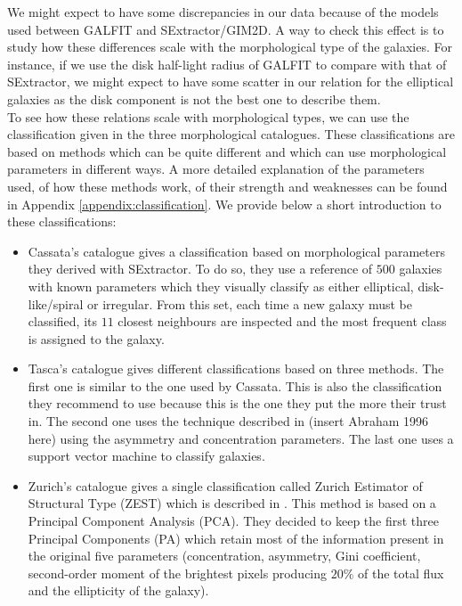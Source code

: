 We might expect to have some discrepancies in our data because of the models used between GALFIT and SExtractor/GIM2D. A way to check this effect is to study how these differences scale with the morphological type of the galaxies. For instance, if we use the disk half-light radius of GALFIT to compare with that of SExtractor, we might expect to have some scatter in our relation for the elliptical galaxies as the disk component is not the best one to describe them.\\

To see how these relations scale with morphological types, we can use the classification given in the three morphological catalogues. These classifications are based on methods which can be quite different and which can use morphological parameters in different ways. A more detailed explanation of the parameters used, of how these methods work, of their strength and weaknesses can be found in Appendix \ref{appendix:classification}. We provide below a short introduction to these classifications:

\begin{itemize}
	\item Cassata's catalogue gives a classification based on morphological parameters they derived with SExtractor. To do so, they use a reference of $500$ galaxies with known parameters which they visually classify as either elliptical, disk-like/spiral or irregular. From this set, each time a new galaxy must be classified, its $11$ closest neighbours are inspected and the most frequent class is assigned to the galaxy.
	
	\item Tasca's catalogue gives different classifications based on three methods. The first one is similar to the one used by Cassata. This is also the classification they recommend to use because this is the one they put the more their trust in. The second one uses the technique described in (insert Abraham 1996 here) using the asymmetry and concentration parameters. The last one uses a support vector machine to classify galaxies.
	
	\item Zurich's catalogue gives a single classification called Zurich Estimator of Structural Type (ZEST) which is described in . This method is based on a Principal Component Analysis (PCA). They decided to keep the first three Principal Components (PA) which retain most of the information present in the original five parameters (concentration, asymmetry, Gini coefficient, second-order moment of the brightest pixels producing $20\%$ of the total flux and the ellipticity of the galaxy).
\end{itemize}

